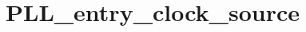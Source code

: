 \hypertarget{group___p_l_l__entry__clock__source}{\section{P\-L\-L\-\_\-entry\-\_\-clock\-\_\-source}
\label{group___p_l_l__entry__clock__source}
}
